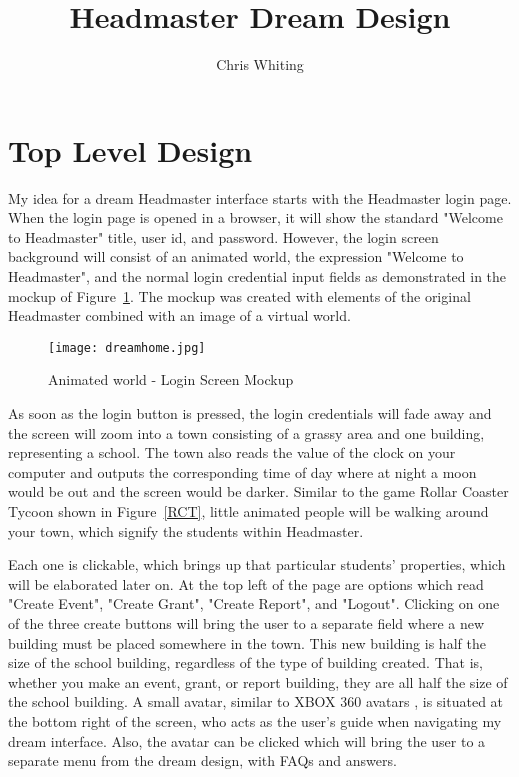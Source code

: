 \documentclass[11pt]{article}
\title{Headmaster Dream Design}
\author{Chris Whiting}
\begin{document}
\maketitle

 
\section{Top Level Design}
My idea for a dream Headmaster interface starts with the Headmaster login page. When the login page is opened in a browser, it will show the standard "Welcome to Headmaster" title, user id, and password. However, the login screen background will consist of an animated world, the expression "Welcome to Headmaster", and the normal login credential input fields as demonstrated in the mockup of Figure~\ref{homepage}. The mockup was created with elements of the original Headmaster combined with an image of a virtual world.

\begin{figure}[h]
\centering
\texttt{[image: dreamhome.jpg]}
\caption{Animated world - Login Screen Mockup}
\label{homepage}
\end{figure}

As soon as the login button is pressed, the login credentials will fade away and the screen will zoom into a town consisting of a grassy area and one building, representing a school. The town also reads the value of the clock on your computer and outputs the corresponding time of day where at night a moon would be out and the screen would be darker. Similar to the game Rollar Coaster Tycoon \cite{rcoast} shown in Figure~\ref{RCT}, little animated people will be walking around your town, which signify the students within Headmaster.

 Each one is clickable, which brings up that particular students' properties, which will be elaborated later on. At the top left of the page are options which read "Create Event", "Create Grant", "Create Report", and "Logout". Clicking on one of the three create buttons will bring the user to a separate field where a new building must be placed somewhere in the town. This new building is half the size of the school building, regardless of the type of building created. That is, whether you make an event, grant, or report building, they are all half the size of the school building. A small avatar, similar to XBOX 360 avatars \cite{xbox}, is situated at the bottom right of the screen, who acts as the user's guide when navigating my dream interface. Also, the avatar can be clicked which will bring the user to a separate menu from the dream design, with FAQs and answers.
\end{document}
